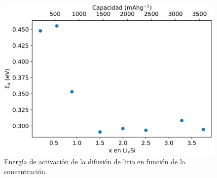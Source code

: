 \begin{figure}[h!]
    \centering
    \includegraphics[width=.7\textwidth]{Silicio/comportamiento/resultados/concentracion/activacion/activacion.png}
    \caption{Energía de activación de la difusión de litio en función de la concentración.}
    \label{fig:tactivacion}
\end{figure}
